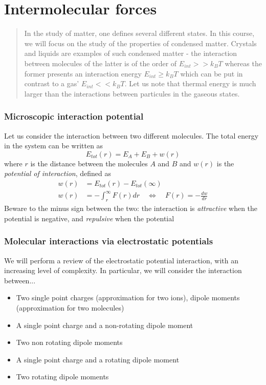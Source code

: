 \documentclass[../phys-f308.tex]{subfiles}
\begin{document}
    \part{Intermolecular forces}
    \begin{abstract}
        In the study of matter, one defines several different states. In this course, we will focus on the study of the properties of condensed matter. Crystals and liquids are examples of such condensed matter - the interaction between molecules of the latter is of the order of $E_{int}>> k_BT$ whereas the former presents an interaction energy $E_{int}\geq k_BT$ which can be put in contrast to a gas' $E_{int}<< k_BT$. Let us note that thermal energy is much larger than the interactions between particules in the gaseous states. 
    \end{abstract}

    \section{Microscopic interaction potential}

    Let us consider the interaction between two different molecules. The total energy in the system can be written as
    \begin{equation}
        E_{tot}(r) = E_A+E_B+w(r)
    \end{equation}
    where $r$ is the distance between the molecules $A$ and $B$ and $w(r)$ is the \emph{potential of interaction}, defined as
    \begin{align}
        w(r) &= E_{tot}(r) - E_{tot}(\infty)\\
        w(r) &= -\int_r^{\infty}F(r)dr \quad \Leftrightarrow \quad F(r) = -\frac{dw}{dr}\label{eq: F dw/dr}
    \end{align}
    Beware to the minus sign between the two: the interaction is \emph{attractive} when the potential is negative, and \emph{repulsive} when the potential   

    \section{Molecular interactions via electrostatic potentials}

    We will perform a review of the electrostatic potential interaction, with an increasing level of complexity. In particular, we will consider the interaction between...
    \begin{itemize}
        \item Two single point charges (approximation for two ions), dipole moments (approximation for two molecules)
        \item A single point charge and a non-rotating dipole moment
        \item Two non rotating dipole moments
        \item A single point charge and a rotating dipole moment
        \item Two rotating dipole moments
    \end{itemize}
\end{document}
